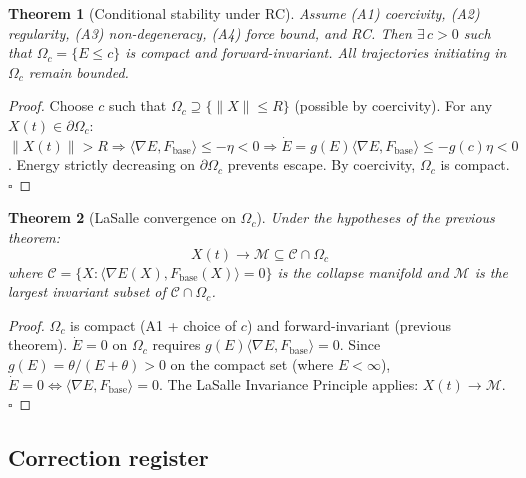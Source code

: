 \documentclass[11pt,a4paper]{article}
\newtheorem{theorem}{Theorem}[section]
\theoremstyle{definition}
\newcommand{\Fbase}{F_{\mathrm{base}}}
\begin{document}
\begin{theorem}[Conditional stability under RC]
Assume (A1) coercivity, (A2) regularity, (A3) non-degeneracy, (A4) force bound, and RC.
Then $\exists\,c>0$ such that $\Omega_c = \{E\leq c\}$ is compact and
forward-invariant. All trajectories initiating in $\Omega_c$ remain bounded.
\end{theorem}

\begin{proof}
Choose $c$ such that $\Omega_c\supseteq\{\|X\|\leq R\}$ (possible by coercivity).
For any $X(t)\in\partial\Omega_c$: $\|X(t)\|>R\Rightarrow
\langle\nabla E,\Fbase\rangle\leq-\eta<0\Rightarrow
\dot E = g(E)\langle\nabla E,\Fbase\rangle\leq -g(c)\eta<0$.
Energy strictly decreasing on $\partial\Omega_c$ prevents escape.
By coercivity, $\Omega_c$ is compact. $\square$
\end{proof}

\begin{theorem}[LaSalle convergence on $\Omega_c$]
Under the hypotheses of the previous theorem:
\[
X(t)\to\mathcal{M}\subseteq\mathcal{C}\cap\Omega_c
\]
where $\mathcal{C} = \{X:\langle\nabla E(X),\Fbase(X)\rangle=0\}$
is the collapse manifold and $\mathcal{M}$ is the largest invariant subset of
$\mathcal{C}\cap\Omega_c$.
\end{theorem}

\begin{proof}
$\Omega_c$ is compact (A1 + choice of $c$) and forward-invariant (previous theorem).
$\dot E = 0$ on $\Omega_c$ requires $g(E)\langle\nabla E,\Fbase\rangle=0$.
Since $g(E)=\theta/(E+\theta)>0$ on the compact set (where $E<\infty$),
$\dot E=0\iff\langle\nabla E,\Fbase\rangle=0$.
The LaSalle Invariance Principle applies: $X(t)\to\mathcal{M}$. $\square$
\end{proof}

\subsection{Correction register}
\end{document}
